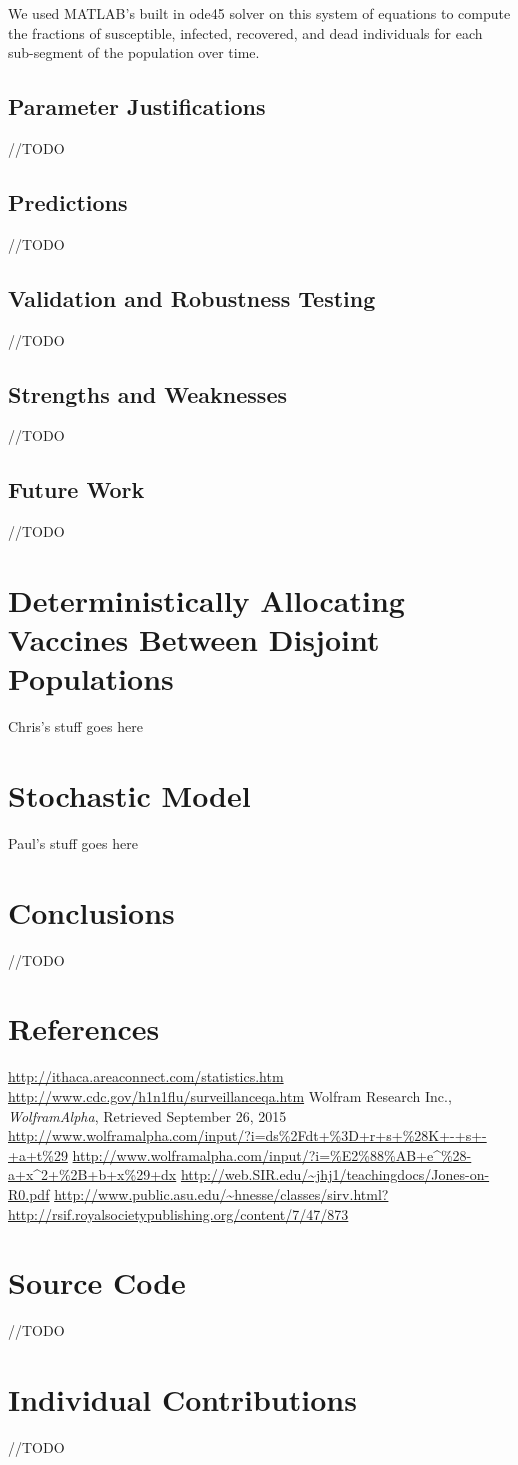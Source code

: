 \documentclass[titlepage]{article}
\begin{document}
	We used MATLAB's built in ode45 solver on this system of equations to compute the fractions of susceptible, infected, recovered, and dead individuals for each sub-segment of the population over time.
\subsection{Parameter Justifications}
	//TODO
\subsection{Predictions}
	//TODO
\subsection{Validation and Robustness Testing}
	//TODO
\subsection{Strengths and Weaknesses}
	//TODO
\subsection{Future Work}
	//TODO

\section{Deterministically Allocating Vaccines Between Disjoint Populations}
	Chris's stuff goes here

\section{Stochastic Model}
	Paul's stuff goes here

\section{Conclusions}
	//TODO
\section{References}
	\begin{thebibliography}{9}
		\url{http://ithaca.areaconnect.com/statistics.htm}
		\url{http://www.cdc.gov/h1n1flu/surveillanceqa.htm}
		Wolfram Research Inc.,
		\emph{WolframAlpha},
		Retrieved September 26, 2015
		\url{http://www.wolframalpha.com/input/?i=ds%2Fdt+%3D+r+s+%28K+-+s+-+a+t%29}
		\url{http://www.wolframalpha.com/input/?i=%E2%88%AB+e^%28-a+x^2+%2B+b+x%29+dx}
		\url{http://web.SIR.edu/~jhj1/teachingdocs/Jones-on-R0.pdf}
		\url{http://www.public.asu.edu/~hnesse/classes/sirv.html?}
		\url{http://rsif.royalsocietypublishing.org/content/7/47/873}
	\end{thebibliography}

\section{Source Code}
	//TODO
\section{Individual Contributions}
	//TODO
\end{document}
